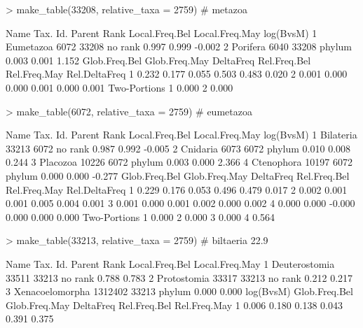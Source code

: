 \documentclass{article}
\begin{document}
\begin{Schunk}
\begin{Sinput}
> make_table(33208, relative_taxa = 2759) # metazoa
\end{Sinput}
\begin{Soutput}
       Name Tax. Id. Parent    Rank Local.Freq.Bel Local.Freq.May log(BvsM)
1 Eumetazoa     6072  33208 no rank          0.997          0.999    -0.002
2  Porifera     6040  33208  phylum          0.003          0.001     1.152
  Glob.Freq.Bel Glob.Freq.May DeltaFreq Rel.Freq.Bel Rel.Freq.May Rel.DeltaFreq
1         0.232         0.177     0.055        0.503        0.483         0.020
2         0.001         0.000     0.000        0.001        0.000         0.001
  Two-Portions
1        0.000
2        0.000
\end{Soutput}
\begin{Sinput}
> make_table(6072, relative_taxa = 2759)  # eumetazoa   
\end{Sinput}
\begin{Soutput}
        Name Tax. Id. Parent    Rank Local.Freq.Bel Local.Freq.May log(BvsM)
1  Bilateria    33213   6072 no rank          0.987          0.992    -0.005
2   Cnidaria     6073   6072  phylum          0.010          0.008     0.244
3   Placozoa    10226   6072  phylum          0.003          0.000     2.366
4 Ctenophora    10197   6072  phylum          0.000          0.000    -0.277
  Glob.Freq.Bel Glob.Freq.May DeltaFreq Rel.Freq.Bel Rel.Freq.May Rel.DeltaFreq
1         0.229         0.176     0.053        0.496        0.479         0.017
2         0.002         0.001     0.001        0.005        0.004         0.001
3         0.001         0.000     0.001        0.002        0.000         0.002
4         0.000         0.000    -0.000        0.000        0.000         0.000
  Two-Portions
1        0.000
2        0.000
3        0.000
4        0.564
\end{Soutput}
\begin{Sinput}
> make_table(33213, relative_taxa = 2759) # biltaeria       22.9% B and 17.6% M
\end{Sinput}
\begin{Soutput}
             Name Tax. Id. Parent    Rank Local.Freq.Bel Local.Freq.May
1   Deuterostomia    33511  33213 no rank          0.788          0.783
2     Protostomia    33317  33213 no rank          0.212          0.217
3 Xenacoelomorpha  1312402  33213  phylum          0.000          0.000
  log(BvsM) Glob.Freq.Bel Glob.Freq.May DeltaFreq Rel.Freq.Bel Rel.Freq.May
1     0.006         0.180         0.138     0.043        0.391        0.375

\end{Soutput}
\end{Schunk}
\end{document}
